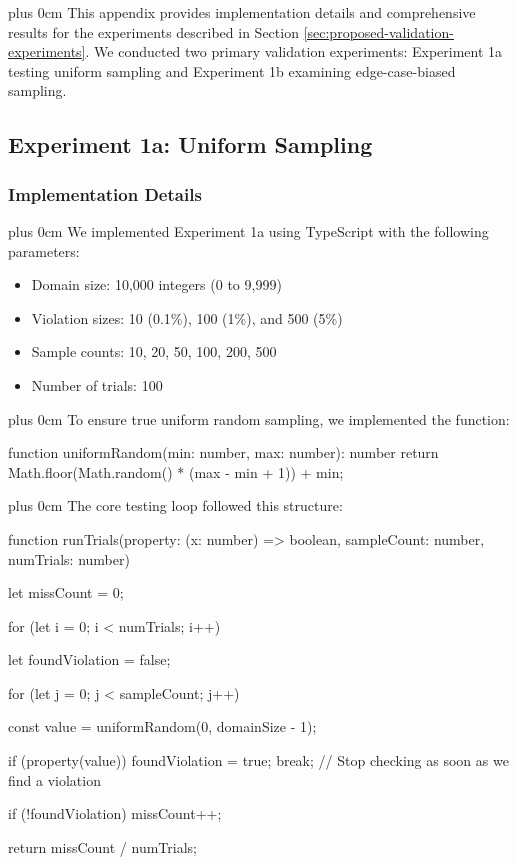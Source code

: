 \documentclass[11pt,a4paper]{article}
\newcommand{\justifytext}{\leftskip=0pt \rightskip=0pt plus 0cm}
\begin{document}
\justifytext
This appendix provides implementation details and comprehensive results for the experiments described in Section \ref{sec:proposed-validation-experiments}. We conducted two primary validation experiments: Experiment 1a testing uniform sampling and Experiment 1b examining edge-case-biased sampling.

\subsection{Experiment 1a: Uniform Sampling}
\label{subsec:experiment1a}

\subsubsection{Implementation Details}

\justifytext
We implemented Experiment 1a using TypeScript with the following parameters:

\begin{itemize}
\item Domain size: 10,000 integers (0 to 9,999)
\item Violation sizes: 10 (0.1\%), 100 (1\%), and 500 (5\%)
\item Sample counts: 10, 20, 50, 100, 200, 500
\item Number of trials: 100
\end{itemize}

\justifytext
To ensure true uniform random sampling, we implemented the function:

\begin{wrappedcode}
function uniformRandom(min: number, max: number): number {
  return Math.floor(Math.random() * (max - min + 1)) + min;
}
\end{wrappedcode}

\justifytext
The core testing loop followed this structure:

\begin{wrappedcode}
function runTrials(property: (x: number) => boolean, sampleCount: number, numTrials: number) {
  let missCount = 0;

  for (let i = 0; i < numTrials; i++) {
    let foundViolation = false;
    
    for (let j = 0; j < sampleCount; j++) {
      const value = uniformRandom(0, domainSize - 1);
      
      if (property(value)) {
        foundViolation = true;
        break; // Stop checking as soon as we find a violation
      }
    }
    
    if (!foundViolation) {
      missCount++;
    }
  }

  return missCount / numTrials;
}
\end{wrappedcode}
\end{document}
